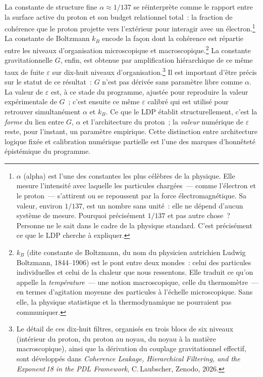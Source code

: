 \documentclass[12pt, a4paper, openright]{book}
\begin{document}
La constante de structure fine $\alpha \approx 1/137$ se réinterprète comme le rapport entre la surface active du proton et son budget relationnel total~: la fraction de cohérence que le proton projette vers l'extérieur pour interagir avec un électron.\footnote{$\alpha$ (alpha) est l'une des constantes les plus célèbres de la physique. Elle mesure l'intensité avec laquelle les particules chargées~--- comme l'électron et le proton~--- s'attirent ou se repoussent par la force électromagnétique. Sa valeur, environ $1/137$, est un nombre sans unité~: elle ne dépend d'aucun système de mesure. Pourquoi précisément $1/137$ et pas autre chose~? Personne ne le sait dans le cadre de la physique standard. C'est précisément ce que le LDP cherche à expliquer.} La constante de Boltzmann $k_B$ encode la façon dont la cohérence est répartie entre les niveaux d'organisation microscopique et macroscopique.\footnote{$k_B$ (dite \og constante de Boltzmann\fg{}, du nom du physicien autrichien Ludwig Boltzmann, 1844--1906) est le pont entre deux mondes~: celui des particules individuelles et celui de la chaleur que nous ressentons. Elle traduit ce qu'on appelle la \emph{température}~--- une notion macroscopique, celle du thermomètre~--- en termes d'agitation moyenne des particules à l'échelle microscopique. Sans elle, la physique statistique et la thermodynamique ne pourraient pas communiquer.} La constante gravitationnelle $G$, enfin, est obtenue par amplification hiérarchique de ce même taux de fuite $\varepsilon$ sur dix-huit niveaux d'organisation.\footnote{Le détail de ces dix-huit filtres, organisés en trois blocs de six niveaux (intérieur du proton, du proton au noyau, du noyau à la matière macroscopique), ainsi que la dérivation du couplage gravitationnel effectif, sont développés dans \textit{Coherence Leakage, Hierarchical Filtering, and the Exponent\,18 in the PDL Framework}, C.\,Laubscher, Zenodo, 2026.} Il est important d'être précis sur le statut de ce résultat~: $G$ n'est pas dérivée sans paramètre libre comme $\alpha$. La valeur de $\varepsilon$ est, à ce stade du programme, ajustée pour reproduire la valeur expérimentale de $G$~; c'est ensuite ce même $\varepsilon$ calibré qui est utilisé pour retrouver simultanément $\alpha$ et $k_B$. Ce que le LDP établit structurellement, c'est la \emph{forme} du lien entre $G$, $\alpha$ et l'architecture du proton~; la \emph{valeur} numérique de $\varepsilon$ reste, pour l'instant, un paramètre empirique. Cette distinction entre architecture logique fixée et calibration numérique partielle est l'une des marques d'honnêteté épistémique du programme.
\end{document}
